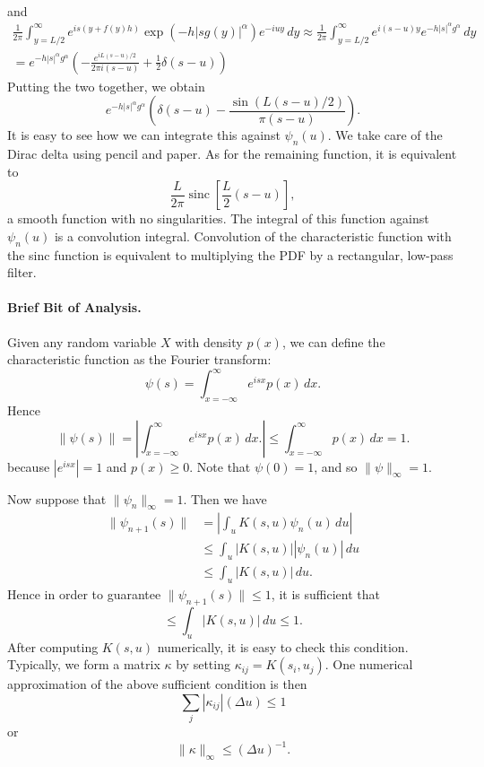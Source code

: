 \documentclass[11pt,letterpaper]{article}
\begin{document}
\begin{enumerate}
\begin{multline*}
\end{multline*}
and
\begin{multline*}
\frac{1}{2 \pi} \int_{y=L/2}^{\infty} e^{is\left(y+f(y)h\right)}\exp{\left(  -h |s g(y)|^{\alpha} \right)}e^{-iuy}\, dy \approx \frac{1}{2 \pi} \int_{y=L/2}^{\infty} e^{i(s-u)y} e^{-h |s|^\alpha g^\alpha} \, dy \\
 = e^{-h |s|^\alpha g^\alpha} \left( -\frac{ e^{iL (s-u)/2} }{2 \pi i (s-u)} + \frac{1}{2} \delta(s-u) \right)
\end{multline*}
Putting the two together, we obtain
$$
e^{-h |s|^\alpha g^\alpha} \left( \delta(s-u) - \frac{\sin (L(s-u)/2)}{\pi (s-u)} \right).
$$
It is easy to see how we can integrate this against $\psi_n(u)$.  We take care of the Dirac delta using pencil and paper.  As for the remaining function, it is equivalent to
$$
\frac{L}{2 \pi} \operatorname{sinc} \left[ \frac{L}{2} (s-u) \right],
$$
a smooth function with no singularities.  The integral of this function against $\psi_n(u)$ is a convolution integral.  Convolution of the characteristic function with the sinc function is equivalent to multiplying the PDF by a rectangular, low-pass filter.
\end{enumerate}

\paragraph{Brief Bit of Analysis.} Given any random variable $X$ with density $p(x)$, we can define the characteristic function as the Fourier transform:
\[
\psi(s) = \int_{x=-\infty}^\infty e^{i s x} p(x) \, dx.
\]
Hence
\[
\| \psi(s) \| = \left| \int_{x=-\infty}^\infty e^{i s x} p(x) \, dx. \right| \leq \int_{x=-\infty}^\infty p(x) \, dx = 1.
\]
because $|e^{i s x}| = 1$ and $p(x) \geq 0$.  Note that $\psi(0) = 1$, and so $\|\psi \|_\infty = 1$.

\noindent Now suppose that $\| \psi_n \|_\infty = 1$.  Then we have
\begin{align*}
\| \psi_{n+1} (s) \| &= \left| \int_u K(s,u) \psi_n(u) \, du \right| \\
 &\leq \int_u |K(s,u)| |\psi_n(u)| \, du \\
 &\leq \int_u |K(s,u)| \, du.
\end{align*}
Hence in order to guarantee $\| \psi_{n+1}(s) \| \leq 1$, it is sufficient that
\[
\leq \int_u |K(s,u)| \, du \leq 1.
\]
After computing $K(s,u)$ numerically, it is easy to check this condition.  Typically, we form a matrix $\kappa$ by setting $\kappa_{ij} = K(s_i, u_j)$.  One numerical approximation of the above sufficient condition is then
\[
\sum_{j} |\kappa_{ij}| (\Delta u) \leq 1
\]
or
\[
\| \kappa \|_\infty \leq (\Delta u)^{-1}.
\]
\end{document}

